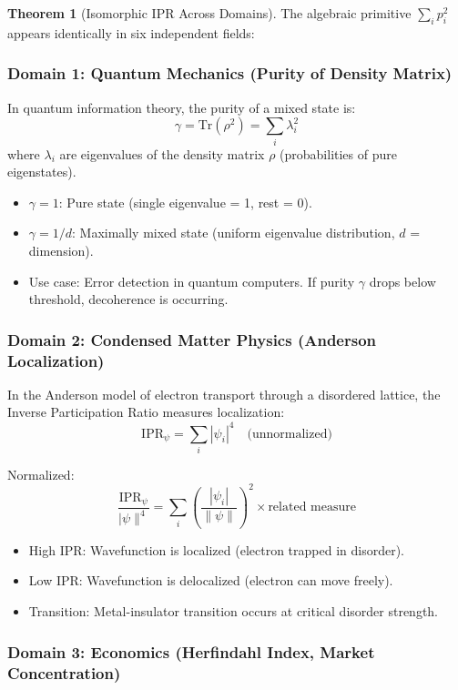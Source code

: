 \documentclass[11pt,oneside]{article}
\theoremstyle{definition}
\newtheorem{theorem}{Theorem}
\begin{document}
\begin{theorem}[Isomorphic IPR Across Domains]
The algebraic primitive $\sum_i p_i^2$ appears identically in six independent fields:

\end{theorem}

\subsubsection{Domain 1: Quantum Mechanics (Purity of Density Matrix)}

In quantum information theory, the purity of a mixed state is:
\[
\gamma = \text{Tr}(\rho^2) = \sum_i \lambda_i^2
\]
where $\lambda_i$ are eigenvalues of the density matrix $\rho$ (probabilities of pure eigenstates).

\begin{itemize}
  \item $\gamma = 1$: Pure state (single eigenvalue = 1, rest = 0).
  \item $\gamma = 1/d$: Maximally mixed state (uniform eigenvalue distribution, $d$ = dimension).
  \item Use case: Error detection in quantum computers. If purity $\gamma$ drops below threshold, decoherence is occurring.
\end{itemize}

\subsubsection{Domain 2: Condensed Matter Physics (Anderson Localization)}

In the Anderson model of electron transport through a disordered lattice, the Inverse Participation Ratio measures localization:
\[
\text{IPR}_{\psi} = \sum_i |\psi_i|^4 \quad \text{(unnormalized)}
\]

Normalized:
\[
\frac{\text{IPR}_{\psi}}{|\psi\|^4} = \sum_i \left(\frac{|\psi_i|}{\|\psi\|}\right)^2 \times \text{related measure}
\]

\begin{itemize}
  \item High IPR: Wavefunction is localized (electron trapped in disorder).
  \item Low IPR: Wavefunction is delocalized (electron can move freely).
  \item Transition: Metal-insulator transition occurs at critical disorder strength.
\end{itemize}

\subsubsection{Domain 3: Economics (Herfindahl Index, Market Concentration)}
\end{document}
